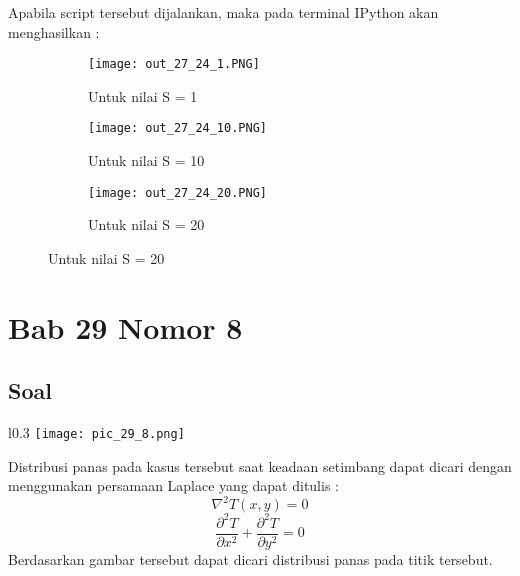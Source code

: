 \documentclass[a4paper,12pt]{article}
\numberwithin{equation}{section} %
\begin{document}
Apabila script tersebut dijalankan, maka pada terminal IPython akan menghasilkan :
\begin{figure}[h!]
  \centering
  \begin{subfigure}[b]{0.4\linewidth}
    \texttt{[image: out\_27\_24\_1.PNG]}
     \caption{Untuk nilai S = 1}
  \end{subfigure}
  \begin{subfigure}[b]{0.4\linewidth}
    \texttt{[image: out\_27\_24\_10.PNG]}
    \caption{Untuk nilai S = 10}
  \end{subfigure}
  \begin{subfigure}[b]{0.4\linewidth}
    \texttt{[image: out\_27\_24\_20.PNG]}
    \caption{Untuk nilai S = 20}
  \end{subfigure}
\end{figure}

\newpage
\section{Bab 29 Nomor 8}
\subsection{Soal}
\begin{wrapfigure}{l}{0.3\textwidth} %
    \centering
    \texttt{[image: pic\_29\_8.png]}
\end{wrapfigure}
Distribusi panas pada kasus tersebut saat keadaan setimbang dapat dicari dengan menggunakan persamaan Laplace yang dapat ditulis :
$$\nabla ^2 T(x,y) = 0$$
\begin{equation}
\frac{\partial^2 T}{\partial x^2} + \frac{\partial^2 T}{\partial y^2} = 0
\end{equation}
Berdasarkan gambar tersebut dapat dicari distribusi panas pada titik tersebut.
\end{document}
